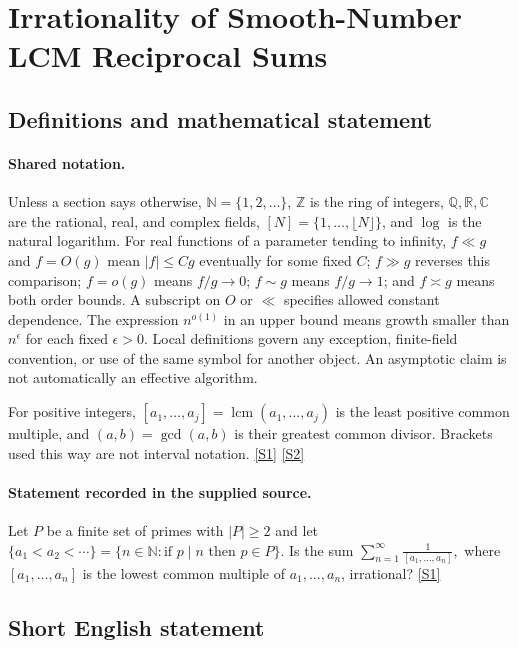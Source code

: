 \documentclass[11pt,a4paper]{article}
\newcommand{\N}{\mathbb{N}}
\newcommand{\Z}{\mathbb{Z}}
\newcommand{\Q}{\mathbb{Q}}
\newcommand{\R}{\mathbb{R}}
\newcommand{\C}{\mathbb{C}}
\newcommand{\sref}[2]{\hyperlink{source:#1:#2}{[S#2]}}
\begin{document}
\section{Irrationality of Smooth-Number LCM Reciprocal Sums}\label{statement}


\subsection{Definitions and mathematical statement}

\paragraph{Shared notation.}Unless a section says otherwise, $\N=\{1,2,\ldots\}$,
$\Z$ is the ring of integers, $\Q,\R,\C$ are the rational, real, and complex
fields, $[N]=\{1,\ldots,\lfloor N\rfloor\}$, and $\log$ is the natural
logarithm. For real functions of a parameter tending to infinity,
$f\ll g$ and $f=O(g)$ mean $|f|\leq Cg$ eventually for some fixed $C$;
$f\gg g$ reverses this comparison; $f=o(g)$ means $f/g\to0$;
$f\sim g$ means $f/g\to1$; and $f\asymp g$ means both order bounds.
A subscript on $O$ or $\ll$ specifies allowed constant dependence.
The expression $n^{o(1)}$ in an upper bound means growth smaller than
$n^\epsilon$ for each fixed $\epsilon>0$. Local definitions govern any
exception, finite-field convention, or use of the same symbol for another
object. An asymptotic claim is not automatically an effective algorithm.



For positive integers, $[a_1,\ldots,a_j]=\operatorname{lcm}(a_1,\ldots,a_j)$ is the least positive common multiple, and $(a,b)=\gcd(a,b)$ is their greatest common divisor. Brackets used this way are not interval notation. \sref{statement}{1} \sref{statement}{2}

\paragraph{Statement recorded in the supplied source.}
Let $P$ be a finite set of primes with $\lvert P\rvert \geq 2$ and let $\{a_1<a_2<\cdots\}=\{ n\in \mathbb{N} : \textrm{if }p\mid n\textrm{ then }p\in P\}$. Is the sum $ \sum_{n=1}^\infty \frac{1}{[a_1,\ldots,a_n]}, $ where $[a_1,\ldots,a_n]$ is the lowest common multiple of $a_1,\ldots,a_n$, irrational? \sref{statement}{1}

\subsection{Short English statement}
\end{document}
